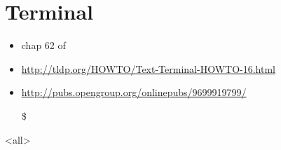 \mode*
\part{Terminal}

\begin{itemize}
\item chap 62 of 
\item \url{http://tldp.org/HOWTO/Text-Terminal-HOWTO-16.html}
\item \url{http://pubs.opengroup.org/onlinepubs/9699919799/}
\item[\$] 
\end{itemize}


\mode<all>
